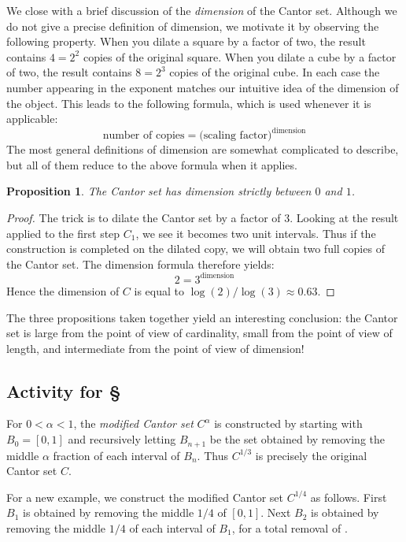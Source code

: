 \documentclass[11pt,oneside]{amsbook}
\theoremstyle{definition}
\theoremstyle{plain}
\newtheorem{proposition}[theorem]{Proposition}
\theoremstyle{definition}
\theoremstyle{remark}
\numberwithin{equation}{section}
\numberwithin{figure}{section}
\begin{document}
We close with a brief discussion of the \emph{dimension} of the Cantor set. Although we do not give a precise definition of dimension, we motivate it by observing the following property. When you dilate a square by a factor of two, the result contains $4=2^2$ copies of the original square. When you dilate a cube by a factor of two, the result contains $8=2^3$ copies of the original cube. In each case the number appearing in the exponent matches our intuitive idea of the dimension of the object. This leads to the following formula, which is used whenever it is applicable:
\[\text{number of copies}=\text{(scaling factor)}^\text{dimension}
\]
The most general definitions of dimension are somewhat complicated to describe, but all of them reduce to the above formula when it applies.

\begin{proposition}
  The Cantor set has dimension strictly between $0$ and $1$.
\end{proposition}

\begin{proof}
  The trick is to dilate the Cantor set by a factor of $3$. Looking at the result applied to the first step $C_1$, we see it becomes two unit intervals. Thus if the construction is completed on the dilated copy, we will obtain two full copies of the Cantor set. The dimension formula therefore yields:
\[2=3^{\text{dimension}}
\]
Hence the dimension of $C$ is equal to $\log(2)/\log(3)\approx0.63$.
\end{proof}

The three propositions taken together yield an interesting conclusion: the Cantor set is large from the point of view of cardinality, small from the point of view of length, and intermediate from the point of view of dimension!

\newpage
\subsection*{Activity for \S \thesection}

For $0<\alpha<1$, the \emph{modified Cantor set} $C^\alpha$ is constructed by starting with $B_0=[0,1]$ and recursively letting $B_{n+1}$ be the set obtained by removing the middle $\alpha$ fraction of each interval of $B_n$. Thus $C^{1/3}$ is precisely the original Cantor set $C$.

For a new example, we construct the modified Cantor set $C^{1/4}$ as follows. First $B_1$ is obtained by removing the middle $1/4$ of $[0,1]$. Next $B_2$ is obtained by removing the middle $1/4$ of each interval of $B_1$, for a total removal of \underline{\hspace{1in}}.
\end{document}
